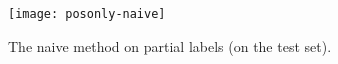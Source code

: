 \begin{answer}
	\begin{figure}[H]
		\centering
		\texttt{[image: posonly-naive]}
		\caption{The naive method on partial labels (on the test set).}
	\end{figure}
\end{answer}

